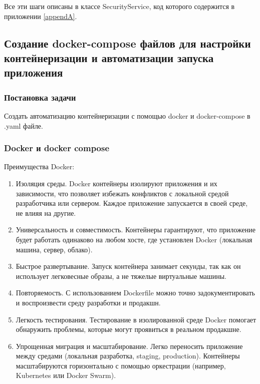 \documentclass[pract]{SCWorks}
\begin{document}
Все эти шаги описаны в классе SecurityService, код которого содержится в 
приложении \ref{appendA}.

\subsection{Создание docker-compose файлов для настройки
    контейнеризации и автоматизации запуска приложения}
\subsubsection{Постановка задачи}
Создать автоматизацию контейнеризации с помощью docker и docker-compose
в .yaml файле.

\subsubsection{Docker и docker compose}

Преимущества Docker:
\begin{enumerate}
    \item Изоляция среды. Docker контейнеры изолируют приложения и их 
    зависимости, что позволяет избежать конфликтов с локальной средой 
    разработчика или сервером. Каждое приложение запускается в своей среде, 
    не влияя на другие.

    \item Универсальность и совместимость. Контейнеры гарантируют, что 
    приложение будет работать одинаково на любом хосте, где установлен 
    Docker (локальная машина, сервер, облако).

    \item Быстрое развертывание. Запуск контейнера занимает секунды, так как
     он использует легковесные образы, а не тяжелые виртуальные машины.

    \item Повторяемость. С использованием Dockerfile можно точно 
    задокументировать и воспроизвести среду разработки и продакшн.

    \item Легкость тестирования. Тестирование в изолированной среде Docker 
    помогает обнаружить проблемы, которые могут проявиться в реальном продакшне.

    \item Упрощенная миграция и масштабирование. Легко переносить приложение 
    между средами (локальная разработка, staging, production). Контейнеры 
    масштабируются горизонтально с помощью оркестрации (например, Kubernetes 
    или Docker Swarm).
\end{enumerate}
    
\end{document}

